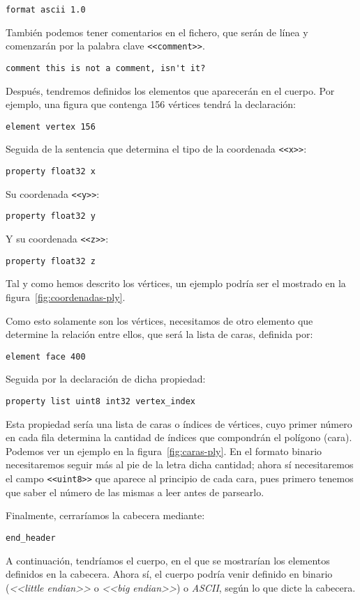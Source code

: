 \verb|format ascii 1.0|

También podemos tener comentarios en el fichero, que serán de línea y comenzarán por la palabra clave \texttt{<<comment>>}.

\verb|comment this is not a comment, isn't it?|

Después, tendremos definidos los elementos que aparecerán en el cuerpo. Por ejemplo, una figura que contenga 156 vértices tendrá la declaración:

\verb|element vertex 156|

\noindent Seguida de la sentencia que determina el tipo de la coordenada \texttt{<<x>>}:

\verb|property float32 x|

\noindent Su coordenada \texttt{<<y>>}:

\verb|property float32 y|

\noindent Y su coordenada \texttt{<<z>>}:

\verb|property float32 z|

Tal y como hemos descrito los vértices, un ejemplo podría ser el mostrado en la figura~\ref{fig:coordenadas-ply}.

Como esto solamente son los vértices, necesitamos de otro elemento que determine la relación entre ellos, que será la lista de caras, definida por:

\verb|element face 400|

\noindent Seguida por la declaración de dicha propiedad:

\verb|property list uint8 int32 vertex_index|

Esta propiedad sería una lista de caras o índices de vértices, cuyo primer número en cada fila determina la cantidad de índices que compondrán el polígono (cara). Podemos ver un ejemplo en la figura~\ref{fig:caras-ply}. En el formato binario necesitaremos seguir más al pie de la letra dicha cantidad; ahora sí necesitaremos el campo \texttt{<<uint8>>} que aparece al principio de cada cara, pues primero tenemos que saber el número de las mismas a leer antes de parsearlo.

\noindent Finalmente, cerraríamos la cabecera mediante:

\verb|end_header|

A continuación, tendríamos el cuerpo, en el que se mostrarían los elementos definidos en la cabecera. Ahora sí, el cuerpo podría venir definido en binario (\textit{<<little endian>>} o \textit{<<big endian>>}) o \textit{ASCII}, según lo que dicte la cabecera.

